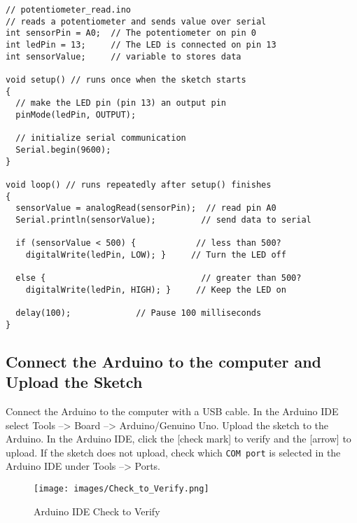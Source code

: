 \documentclass{book}
\makeatletter
\def\maxwidth{\ifdim\Gin@nat@width>\linewidth\linewidth
\else\Gin@nat@width\fi}
\let\Oldincludegraphics\includegraphics
\renewcommand{\includegraphics}[1]{\Oldincludegraphics[width=.8\maxwidth]{#1}}
\newcommand{\passthrough}[1]{#1}
\makeatother
\begin{document}
    
        \begin{lstlisting}
// potentiometer_read.ino
// reads a potentiometer and sends value over serial
int sensorPin = A0;  // The potentiometer on pin 0                  
int ledPin = 13;     // The LED is connected on pin 13
int sensorValue;     // variable to stores data

void setup() // runs once when the sketch starts
{
  // make the LED pin (pin 13) an output pin
  pinMode(ledPin, OUTPUT);

  // initialize serial communication
  Serial.begin(9600);
}

void loop() // runs repeatedly after setup() finishes
{
  sensorValue = analogRead(sensorPin);  // read pin A0   
  Serial.println(sensorValue);         // send data to serial
  
  if (sensorValue < 500) {            // less than 500?
    digitalWrite(ledPin, LOW); }     // Turn the LED off
  
  else {                               // greater than 500?
    digitalWrite(ledPin, HIGH); }     // Keep the LED on
  
  delay(100);             // Pause 100 milliseconds
}
\end{lstlisting}
    




    
        \hypertarget{connect-the-arduino-to-the-computer-and-upload-the-sketch}{%
\subsection{Connect the Arduino to the computer and Upload the
Sketch}\label{connect-the-arduino-to-the-computer-and-upload-the-sketch}}
    




    
        Connect the Arduino to the computer with a USB cable. In the Arduino IDE
select Tools --\textgreater{} Board --\textgreater{} Arduino/Genuino
Uno. Upload the sketch to the Arduino. In the Arduino IDE, click the
{[}check mark{]} to verify and the {[}arrow{]} to upload. If the sketch
does not upload, check which \passthrough{\lstinline!COM port!} is
selected in the Arduino IDE under Tools --\textgreater{} Ports.

\begin{figure}
\centering
\texttt{[image: images/Check\_to\_Verify.png]}
\caption{Arduino IDE Check to Verify}
\end{figure}
\end{document}
